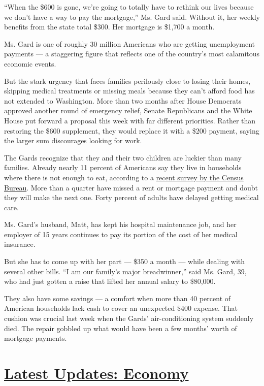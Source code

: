 ``When the \$600 is gone, we're going to totally have to rethink our
lives because we don't have a way to pay the mortgage,'' Ms. Gard said.
Without it, her weekly benefits from the state total \$300. Her mortgage
is \$1,700 a month.

Ms. Gard is one of roughly 30 million Americans who are getting
unemployment payments --- a staggering figure that reflects one of the
country's most calamitous economic events.

But the stark urgency that faces families perilously close to losing
their homes, skipping medical treatments or missing meals because they
can't afford food has not extended to Washington. More than two months
after House Democrats approved another round of emergency relief, Senate
Republicans and the White House put forward a proposal this week with
far different priorities. Rather than restoring the \$600 supplement,
they would replace it with a \$200 payment, saying the larger sum
discourages looking for work.

The Gards recognize that they and their two children are luckier than
many families. Already nearly 11 percent of Americans say they live in
households where there is not enough to eat, according to a
\href{https://www.census.gov/programs-surveys/household-pulse-survey/data.html?utm_campaign=20200727mspuls1ccdtanl\&utm_medium=email\&utm_source=govdelivery}{recent
survey by the Census Bureau}. More than a quarter have missed a rent or
mortgage payment and doubt they will make the next one. Forty percent of
adults have delayed getting medical care.

Ms. Gard's husband, Matt, has kept his hospital maintenance job, and her
employer of 15 years continues to pay its portion of the cost of her
medical insurance.

But she has to come up with her part --- \$350 a month --- while dealing
with several other bills. ``I am our family's major breadwinner,'' said
Ms. Gard, 39, who had just gotten a raise that lifted her annual salary
to \$80,000.

They also have some savings --- a comfort when more than 40 percent of
American households lack cash to cover an unexpected \$400 expense. That
cushion was crucial last week when the Gards' air-conditioning system
suddenly died. The repair gobbled up what would have been a few months'
worth of mortgage payments.

\hypertarget{latest-updates-economy}{%
\section{\texorpdfstring{\href{https://www.nytimes.com/live/2020/07/31/business/stock-market-today-coronavirus?action=click\&pgtype=Article\&state=default\&region=MAIN_CONTENT_1\&context=storylines_live_updates}{Latest
Updates:
Economy}}{Latest Updates: Economy}}\label{latest-updates-economy}}

